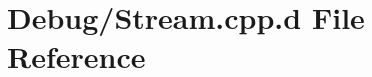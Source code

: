 \hypertarget{_debug_2_stream_8cpp_8d}{\section{\-Debug/\-Stream.cpp.\-d \-File \-Reference}
\label{_debug_2_stream_8cpp_8d}
}
